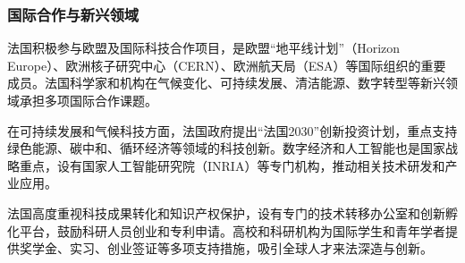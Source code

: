 \subsubsection{国际合作与新兴领域}

法国积极参与欧盟及国际科技合作项目，是欧盟“地平线计划”（Horizon Europe）、欧洲核子研究中心（CERN）、欧洲航天局（ESA）等国际组织的重要成员。法国科学家和机构在气候变化、可持续发展、清洁能源、数字转型等新兴领域承担多项国际合作课题。

在可持续发展和气候科技方面，法国政府提出“法国2030”创新投资计划，重点支持绿色能源、碳中和、循环经济等领域的科技创新。数字经济和人工智能也是国家战略重点，设有国家人工智能研究院（INRIA）等专门机构，推动相关技术研发和产业应用。

法国高度重视科技成果转化和知识产权保护，设有专门的技术转移办公室和创新孵化平台，鼓励科研人员创业和专利申请。高校和科研机构为国际学生和青年学者提供奖学金、实习、创业签证等多项支持措施，吸引全球人才来法深造与创新。
